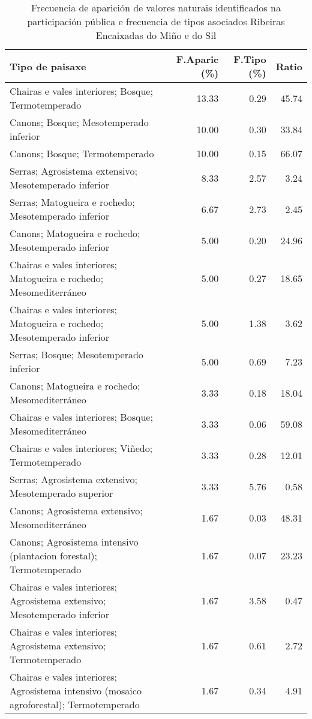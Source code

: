 \begin{table}[p]
\centering
\caption{Frecuencia de aparición de valores naturais identificados na participación pública e frecuencia de tipos asociados Ribeiras Encaixadas do Miño e do Sil} 
\label{vsixotnat4}
\begin{tabular}{lrrr}
  \hline
Tipo de paisaxe & F.Aparic (\%) & F.Tipo (\%) & Ratio \\ 
  \hline
Chairas e vales interiores; Bosque; Termotemperado & 13.33 & 0.29 & 45.74 \\ 
  Canons; Bosque; Mesotemperado inferior & 10.00 & 0.30 & 33.84 \\ 
  Canons; Bosque; Termotemperado & 10.00 & 0.15 & 66.07 \\ 
  Serras; Agrosistema extensivo; Mesotemperado inferior & 8.33 & 2.57 & 3.24 \\ 
  Serras; Matogueira e rochedo; Mesotemperado inferior & 6.67 & 2.73 & 2.45 \\ 
  Canons; Matogueira e rochedo; Mesotemperado inferior & 5.00 & 0.20 & 24.96 \\ 
  Chairas e vales interiores; Matogueira e rochedo; Mesomediterráneo & 5.00 & 0.27 & 18.65 \\ 
  Chairas e vales interiores; Matogueira e rochedo; Mesotemperado inferior & 5.00 & 1.38 & 3.62 \\ 
  Serras; Bosque; Mesotemperado inferior & 5.00 & 0.69 & 7.23 \\ 
  Canons; Matogueira e rochedo; Mesomediterráneo & 3.33 & 0.18 & 18.04 \\ 
  Chairas e vales interiores; Bosque; Mesomediterráneo & 3.33 & 0.06 & 59.08 \\ 
  Chairas e vales interiores; Viñedo; Termotemperado & 3.33 & 0.28 & 12.01 \\ 
  Serras; Agrosistema extensivo; Mesotemperado superior & 3.33 & 5.76 & 0.58 \\ 
  Canons; Agrosistema extensivo; Mesomediterráneo & 1.67 & 0.03 & 48.31 \\ 
  Canons; Agrosistema intensivo (plantacion forestal); Termotemperado & 1.67 & 0.07 & 23.23 \\ 
  Chairas e vales interiores; Agrosistema extensivo; Mesotemperado inferior & 1.67 & 3.58 & 0.47 \\ 
  Chairas e vales interiores; Agrosistema extensivo; Termotemperado & 1.67 & 0.61 & 2.72 \\ 
  Chairas e vales interiores; Agrosistema intensivo (mosaico agroforestal); Termotemperado & 1.67 & 0.34 & 4.91 \\ 

\end{tabular}
\end{table}
